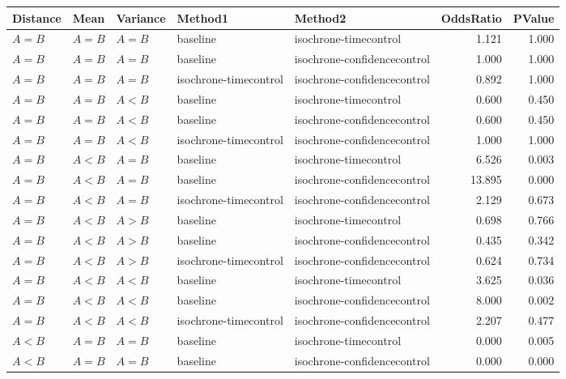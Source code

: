 \begin{tabular}{lllllrr}
\toprule
Distance &  Mean & Variance &               Method1 &                     Method2 &  OddsRatio &  PValue \\
\midrule
   $A=B$ & $A=B$ &    $A=B$ &              baseline &       isochrone-timecontrol &      1.121 &   1.000 \\
   $A=B$ & $A=B$ &    $A=B$ &              baseline & isochrone-confidencecontrol &      1.000 &   1.000 \\
   $A=B$ & $A=B$ &    $A=B$ & isochrone-timecontrol & isochrone-confidencecontrol &      0.892 &   1.000 \\
   $A=B$ & $A=B$ &    $A<B$ &              baseline &       isochrone-timecontrol &      0.600 &   0.450 \\
   $A=B$ & $A=B$ &    $A<B$ &              baseline & isochrone-confidencecontrol &      0.600 &   0.450 \\
   $A=B$ & $A=B$ &    $A<B$ & isochrone-timecontrol & isochrone-confidencecontrol &      1.000 &   1.000 \\
   $A=B$ & $A<B$ &    $A=B$ &              baseline &       isochrone-timecontrol &      6.526 &   0.003 \\
   $A=B$ & $A<B$ &    $A=B$ &              baseline & isochrone-confidencecontrol &     13.895 &   0.000 \\
   $A=B$ & $A<B$ &    $A=B$ & isochrone-timecontrol & isochrone-confidencecontrol &      2.129 &   0.673 \\
   $A=B$ & $A<B$ &    $A>B$ &              baseline &       isochrone-timecontrol &      0.698 &   0.766 \\
   $A=B$ & $A<B$ &    $A>B$ &              baseline & isochrone-confidencecontrol &      0.435 &   0.342 \\
   $A=B$ & $A<B$ &    $A>B$ & isochrone-timecontrol & isochrone-confidencecontrol &      0.624 &   0.734 \\
   $A=B$ & $A<B$ &    $A<B$ &              baseline &       isochrone-timecontrol &      3.625 &   0.036 \\
   $A=B$ & $A<B$ &    $A<B$ &              baseline & isochrone-confidencecontrol &      8.000 &   0.002 \\
   $A=B$ & $A<B$ &    $A<B$ & isochrone-timecontrol & isochrone-confidencecontrol &      2.207 &   0.477 \\
   $A<B$ & $A=B$ &    $A=B$ &              baseline &       isochrone-timecontrol &      0.000 &   0.005 \\
   $A<B$ & $A=B$ &    $A=B$ &              baseline & isochrone-confidencecontrol &      0.000 &   0.000 \\

\end{tabular}

